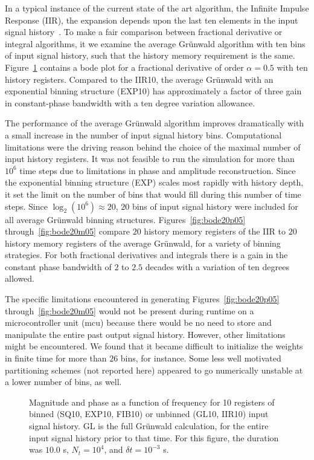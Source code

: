 In a typical instance of the current state of the art algorithm, the
Infinite Impulse Response (IIR), the expansion depends upon the
last ten elements in the input signal history~\cite{Chen:04a}. To make a
fair comparison between fractional derivative or integral algorithms,
it we examine the average Gr{\"u}nwald algorithm with ten bins of input
signal history, such that the history memory requirement is the
same. Figure~\ref{fig:bode10p05} contains a bode plot for a fractional
derivative of order $\alpha=0.5$ with ten history registers. Compared
to the IIR10, the average Gr{\"u}nwald with an exponential binning
structure (EXP10) has approximately a factor of three gain in
constant-phase bandwidth with a ten degree variation allowance. 

The performance of the average Gr{\"u}nwald algorithm improves
dramatically with a small increase in the number of input signal
history bins. Computational limitations were the driving reason behind the choice of the maximal number of input history registers. It was not feasible to run the simulation for more than $10^6$ time steps due to limitations in phase and amplitude reconstruction.  Since the exponential binning structure (EXP) scales most rapidly with history depth, it set the limit on the number of bins that would fill during this number of time steps. Since $\log_2(10^6)\approx 20$, $20$ bins of input signal history were included for all average Gr{\"u}nwald binning structures. Figures~\ref{fig:bode20p05} through~\ref{fig:bode20m05} compare $20$
history memory registers of the IIR to $20$ history memory
registers of the average Gr{\"u}nwald, for a variety of binning
strategies. For both fractional
derivatives and integrals there is a gain in the constant phase
bandwidth of $2$ to $2.5$ decades with a variation of ten degrees allowed.

The specific limitations encountered in generating Figures~\ref{fig:bode20p05} through~\ref{fig:bode20m05} would not be present during runtime on a microcontroller unit (mcu) because there would be no need to store and manipulate the entire past output signal history. However, other limitations might be encountered. We found that it became difficult to initialize the weights in finite time for more than $26$ bins, for instance. Some less well motivated partitioning schemes (not reported here) appeared to go numerically unstable at a lower number of bins, as well. 

\begin{figure}
\caption{Magnitude and phase as a function of frequency for 10
  registers of binned (SQ10, EXP10, FIB10) or unbinned (GL10, IIR10)
  input signal history. GL is the full Gr{\"u}nwald calculation, for the
  entire input signal history prior to that time. For this figure, the duration was $10.0$ s, $N_t=10^4$, and $\delta t = 10^{-3}$ s.}
\label{fig:bode10p05}
\end{figure}


